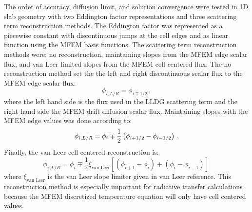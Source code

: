 
The order of accuracy, diffusion limit, and solution convergence were tested in 1D slab geometry with two Eddington factor representations and three scattering term reconstruction methods. The Eddington factor was represented as a piecewise constant with discontinuous jumps at the cell edges and as linear function using the MFEM basis functions. The scattering term reconstruction methods were: no reconstruction, maintaining slopes from the MFEM edge scalar flux, and van Leer limited slopes from the MFEM cell centered flux. The no reconstruction method set the the left and right discontinuous scalar flux to the MFEM edge scalar flux:
	\begin{equation} 
		\phi_{i,L/R} = \phi_{i\mp1/2} \,,
	\end{equation}
where the left hand side is the flux used in the LLDG scattering term and the right hand side the MFEM drift diffusion scalar flux. 
Maintaining slopes with the MFEM edge values was done according to: 
	\begin{equation} \label{eq:edgeReconstruction}
		\phi_{i,L/R} = \phi_i \mp \frac{1}{2}\left(\phi_{i+1/2} - \phi_{i-1/2}\right) \,.
	\end{equation}
Finally, the van Leer cell centered reconstruction is: 
	\begin{equation} \label{eq:vanLeer}
		\phi_{i,L/R} = \phi_i \mp \frac{1}{4} \xi_\text{van Leer} \left[ \left(\phi_{i+1} - \phi_{i}\right) + 
			\left(\phi_{i} - \phi_{i-1}\right)\right] \,
	\end{equation}
where $\xi_\text{van Leer}$ is the van Leer slope limiter given in van Leer reference. This reconstruction method is especially important for radiative transfer calculations because the MFEM discretized temperature equation will only have cell centered values. 

